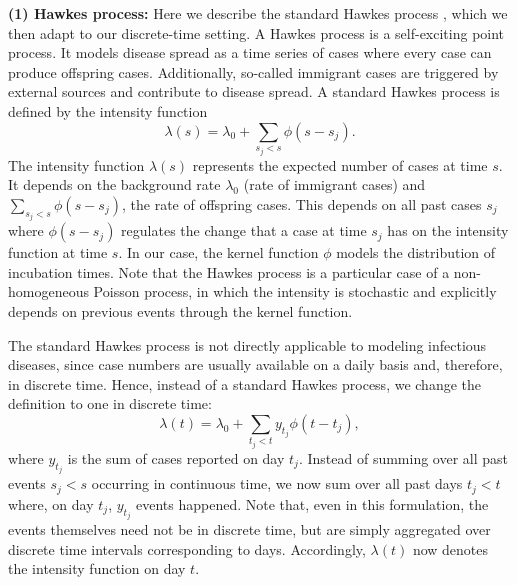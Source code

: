 \documentclass[sigconf, review = false, nonacm = true]{acmart}
\begin{document}
\textbf{(1) Hawkes process:} Here we describe the standard Hawkes process \cite{hawkes_cluster_1974}, which we then adapt to our discrete-time setting. A Hawkes process is a self-exciting point process. It models disease spread as a time series of cases where every case can produce offspring cases. Additionally, so-called immigrant cases are triggered by external sources and contribute to disease spread. A standard Hawkes process is defined by the intensity function
\begin{equation}
    \label{eq:continuous_hawkes}
    \lambda(s) = \lambda_0 + \sum_{s_j < s} \phi(s-s_j).
\end{equation}
The intensity function $\lambda(s)$ represents the expected number of cases at time $s$. It depends on the background rate $\lambda_0$ (rate of immigrant cases) and $\sum_{s_j < s} \phi(s-s_j)$, the rate of offspring cases. This depends on all past cases $s_j$ where $\phi(s-s_j)$ regulates the change that a case at time $s_j$ has on the intensity function at time $s$. In our case, the kernel function $\phi$ models the distribution of incubation times. Note that the Hawkes process is a particular case of a non-homogeneous Poisson process, in which the intensity is stochastic and explicitly depends on previous events through the kernel function.

The standard Hawkes process is not directly applicable to modeling infectious diseases, since case numbers are usually available on a daily basis and, therefore, in discrete time. Hence, instead of a standard Hawkes process, we change the definition to one in discrete time:
\begin{equation}
    \label{eq:discrete_hawkes}
    \lambda(t) = \lambda_0 + \sum_{t_j < t} y_{t_j} \phi(t-t_j),
\end{equation}
where $y_{t_j}$ is the sum of cases reported on day $t_j$. Instead of summing over all past events $s_j < s$ occurring in continuous time, we now sum over all past days $t_j < t$ where, on day $t_j$, $y_{t_j}$ events happened. Note that, even in this formulation, the events themselves need not be in discrete time, but are simply aggregated over discrete time intervals corresponding to days. Accordingly, $\lambda(t)$ now denotes the intensity function on day $t$. 
\end{document}

